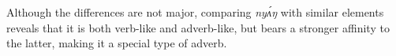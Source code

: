 \documentclass[output=paper,modfonts,nonflat,
]{langsci/langscibook}
\begin{document}
\noindent Although the differences are not major, comparing \textit{ny\'{ʌ}ŋ} with similar elements reveals that it is both verb-like and adverb-like, but bears a stronger affinity to the latter, making it a special type of adverb.







\end{document}
